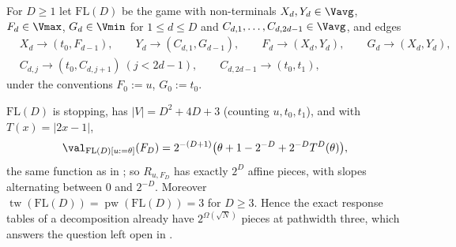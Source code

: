 \begin{definition}\label{wa:def-fl}
For $D\ge1$ let $\mathrm{FL}(D)$ be the game with non-terminals
$X_d,Y_d\in\Vavg$, $F_d\in\Vmax$, $G_d\in\Vmin$ for $1\le d\le D$ and
$C_{d,1},\dots,C_{d,2d-1}\in\Vavg$, and edges
\[
 \begin{aligned}
  &X_d\to(t_0,F_{d-1}),\qquad Y_d\to(C_{d,1},G_{d-1}),\qquad
   F_d\to(X_d,Y_d),\qquad G_d\to(X_d,Y_d),\\
  &C_{d,j}\to(t_0,C_{d,j+1})\ (j<2d-1),\qquad C_{d,2d-1}\to(t_0,t_1),
 \end{aligned}
\]
under the conventions $F_0:=u$, $G_0:=t_0$.
\end{definition}

\begin{theorem}\label{wa:fold3}
$\mathrm{FL}(D)$ is stopping, has $|V|=D^{2}+4D+3$ (counting $u,t_0,t_1$), and
with $T(x)=|2x-1|$,
\[
  \val_{\mathrm{FL}(D)[u:=\theta]}(F_D)
  =2^{-(D+1)}\bigl(\theta+1-2^{-D}+2^{-D}T^{D}(\theta)\bigr),
\]
the same function as in ; so $R_{u,F_D}$ has exactly $2^{D}$
affine pieces, with slopes alternating between $0$ and $2^{-D}$. Moreover
$\operatorname{tw}(\mathrm{FL}(D))=\operatorname{pw}(\mathrm{FL}(D))=3$ for
$D\ge3$. Hence the exact response tables of a decomposition already have
$2^{\Omega(\sqrt N)}$ pieces at pathwidth three, which answers the question left
open in .
\end{theorem}

